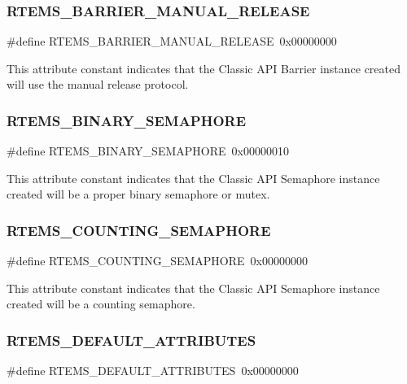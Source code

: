 \subsubsection{\texorpdfstring{RTEMS\_BARRIER\_MANUAL\_RELEASE}{RTEMS\_BARRIER\_MANUAL\_RELEASE}}
{\footnotesize\ttfamily \#define R\+T\+E\+M\+S\+\_\+\+B\+A\+R\+R\+I\+E\+R\+\_\+\+M\+A\+N\+U\+A\+L\+\_\+\+R\+E\+L\+E\+A\+SE~0x00000000}

This attribute constant indicates that the Classic A\+PI Barrier instance created will use the manual release protocol. \mbox{\label{group__ClassicAttributes_ga4830461f6c4f129656c30ed185083c07}} 
\subsubsection{\texorpdfstring{RTEMS\_BINARY\_SEMAPHORE}{RTEMS\_BINARY\_SEMAPHORE}}
{\footnotesize\ttfamily \#define R\+T\+E\+M\+S\+\_\+\+B\+I\+N\+A\+R\+Y\+\_\+\+S\+E\+M\+A\+P\+H\+O\+RE~0x00000010}

This attribute constant indicates that the Classic A\+PI Semaphore instance created will be a proper binary semaphore or mutex. \mbox{\label{group__ClassicAttributes_ga09ff2d373208ebd2a689b268727925c2}} 
\subsubsection{\texorpdfstring{RTEMS\_COUNTING\_SEMAPHORE}{RTEMS\_COUNTING\_SEMAPHORE}}
{\footnotesize\ttfamily \#define R\+T\+E\+M\+S\+\_\+\+C\+O\+U\+N\+T\+I\+N\+G\+\_\+\+S\+E\+M\+A\+P\+H\+O\+RE~0x00000000}

This attribute constant indicates that the Classic A\+PI Semaphore instance created will be a counting semaphore. \mbox{\label{group__ClassicAttributes_gae5dc2c331679bb5da53ab70010061252}} 
\subsubsection{\texorpdfstring{RTEMS\_DEFAULT\_ATTRIBUTES}{RTEMS\_DEFAULT\_ATTRIBUTES}}
{\footnotesize\ttfamily \#define R\+T\+E\+M\+S\+\_\+\+D\+E\+F\+A\+U\+L\+T\+\_\+\+A\+T\+T\+R\+I\+B\+U\+T\+ES~0x00000000}

